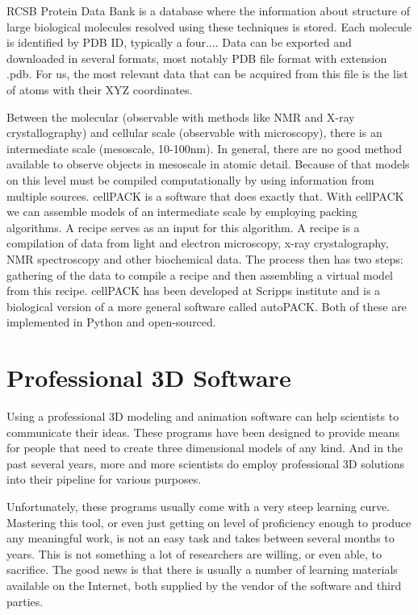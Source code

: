 \documentclass[
  digital, %
  table,   %
  nolof,     %
  nolot,     %
]{fithesis3}
\begin{document}
RCSB Protein Data Bank is a database where the information about structure of large biological molecules resolved using these techniques is stored. Each molecule is identified by PDB ID, typically a four.... Data can be exported and downloaded in several formats, most notably PDB file format with extension .pdb. For us, the most relevant data that can be acquired from this file is the list of atoms with their XYZ coordinates.

Between the molecular (observable with methods like NMR and X-ray crystallography) and cellular scale (observable with microscopy), there is an intermediate scale (mesoscale, 10-100nm). In general, there are no good method available to observe objects in mesoscale in atomic detail. Because of that models on this level must be compiled computationally by using information from multiple sources. cellPACK\cite{cellPACK} is a software that does exactly that. With cellPACK we can assemble models of an intermediate scale by employing packing algorithms. A recipe serves as an input for this algorithm. A recipe is a compilation of data from light and electron microscopy, x-ray crystalography, NMR spectroscopy and other biochemical data. The process then has two steps: gathering of the data to compile a recipe and then assembling a virtual model from this recipe. cellPACK has been developed at Scripps institute and is a biological version of a more general software called autoPACK. Both of these are implemented in Python and open-sourced.

\section{Professional 3D Software}
Using a professional 3D modeling and animation software can help scientists to communicate their ideas. These programs have been designed to provide means for people that need to create three dimensional models of any kind. And in the past several years, more and more scientists do employ professional 3D solutions into their pipeline for various purposes.

Unfortunately, these programs usually come with a very steep learning curve. Mastering this tool, or even just getting on level of proficiency enough to produce any meaningful work, is not an easy task and takes between several months to years. This is not something a lot of researchers are willing, or even able, to sacrifice. The good news is that there is usually a number of learning materials available on the Internet, both supplied by the vendor of the software and third parties.
\end{document}
